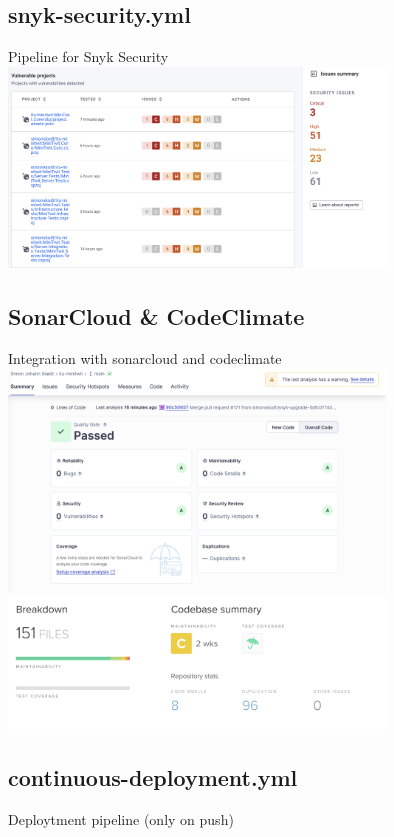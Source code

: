 \subsection{snyk-security.yml}
Pipeline for Snyk Security\\
\includegraphics[width=10cm]{Report/img/Snyk_report.png}

\subsection{SonarCloud \& CodeClimate}
Integration with sonarcloud and codeclimate \\

\includegraphics[width=10cm]{Report/img/Sonar_cloud.png}
\includegraphics[width=10cm]{Report/img/Code_climate.png}

\subsection{continuous-deployment.yml}
Deploytment pipeline (only on push)\\

